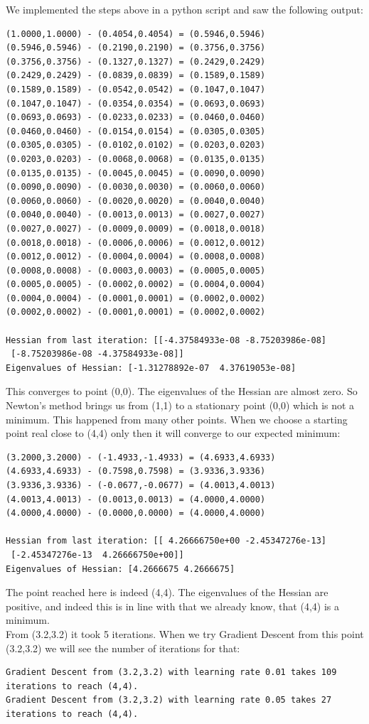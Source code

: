 \documentclass[12pt, letterpaper]{article}
\begin{document}
We implemented the steps above in a python script and saw the following output:
{\footnotesize
\begin{verbatim}
(1.0000,1.0000) - (0.4054,0.4054) = (0.5946,0.5946)
(0.5946,0.5946) - (0.2190,0.2190) = (0.3756,0.3756)
(0.3756,0.3756) - (0.1327,0.1327) = (0.2429,0.2429)
(0.2429,0.2429) - (0.0839,0.0839) = (0.1589,0.1589)
(0.1589,0.1589) - (0.0542,0.0542) = (0.1047,0.1047)
(0.1047,0.1047) - (0.0354,0.0354) = (0.0693,0.0693)
(0.0693,0.0693) - (0.0233,0.0233) = (0.0460,0.0460)
(0.0460,0.0460) - (0.0154,0.0154) = (0.0305,0.0305)
(0.0305,0.0305) - (0.0102,0.0102) = (0.0203,0.0203)
(0.0203,0.0203) - (0.0068,0.0068) = (0.0135,0.0135)
(0.0135,0.0135) - (0.0045,0.0045) = (0.0090,0.0090)
(0.0090,0.0090) - (0.0030,0.0030) = (0.0060,0.0060)
(0.0060,0.0060) - (0.0020,0.0020) = (0.0040,0.0040)
(0.0040,0.0040) - (0.0013,0.0013) = (0.0027,0.0027)
(0.0027,0.0027) - (0.0009,0.0009) = (0.0018,0.0018)
(0.0018,0.0018) - (0.0006,0.0006) = (0.0012,0.0012)
(0.0012,0.0012) - (0.0004,0.0004) = (0.0008,0.0008)
(0.0008,0.0008) - (0.0003,0.0003) = (0.0005,0.0005)
(0.0005,0.0005) - (0.0002,0.0002) = (0.0004,0.0004)
(0.0004,0.0004) - (0.0001,0.0001) = (0.0002,0.0002)
(0.0002,0.0002) - (0.0001,0.0001) = (0.0002,0.0002)

Hessian from last iteration: [[-4.37584933e-08 -8.75203986e-08]
 [-8.75203986e-08 -4.37584933e-08]]
Eigenvalues of Hessian: [-1.31278892e-07  4.37619053e-08]
\end{verbatim}
}
This converges to point (0,0). The eigenvalues of the Hessian are almost zero.
So Newton's method brings us from (1,1) to a stationary point (0,0) which is not a minimum.
This happened from many other points. When we choose a starting point real close to (4,4) only then it will converge to our expected minimum:

{\footnotesize
\begin{verbatim}
(3.2000,3.2000) - (-1.4933,-1.4933) = (4.6933,4.6933)
(4.6933,4.6933) - (0.7598,0.7598) = (3.9336,3.9336)
(3.9336,3.9336) - (-0.0677,-0.0677) = (4.0013,4.0013)
(4.0013,4.0013) - (0.0013,0.0013) = (4.0000,4.0000)
(4.0000,4.0000) - (0.0000,0.0000) = (4.0000,4.0000)

Hessian from last iteration: [[ 4.26666750e+00 -2.45347276e-13]
 [-2.45347276e-13  4.26666750e+00]]
Eigenvalues of Hessian: [4.2666675 4.2666675]
\end{verbatim}
}
The point reached here is indeed (4,4). The eigenvalues of the Hessian are positive, and indeed this is in line with that we already know,
that (4,4) is a minimum.\\
From (3.2,3.2) it took 5 iterations. When we try Gradient Descent from this point (3.2,3.2) we will see the number of iterations for that:
{\footnotesize
\begin{verbatim}
Gradient Descent from (3.2,3.2) with learning rate 0.01 takes 109 iterations to reach (4,4).
Gradient Descent from (3.2,3.2) with learning rate 0.05 takes 27 iterations to reach (4,4).
\end{verbatim}
}
\end{document}
